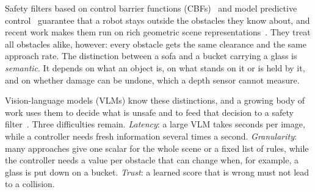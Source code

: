 \documentclass[10pt,a4paper]{article}
\begin{document}
Safety filters based on control barrier functions (CBFs)~\cite{ames2019cbf} and model predictive control~\cite{zeng2021dcbf}
guarantee that a robot stays outside the obstacles they know about, and recent work makes them run on rich geometric scene
representations~\cite{chen2025splatnav,chen2025safersplat,hong2026polymerge,tscholl2025collisioncone}. They treat all obstacles
alike, however: every obstacle gets the same clearance and the same approach rate. The distinction between a sofa and a bucket
carrying a glass is \emph{semantic}. It depends on what an object is, on what stands on it or is held by it, and on whether damage
can be undone, which a depth sensor cannot measure.

Vision-language models (VLMs) know these distinctions, and a growing body of work uses them to decide what is unsafe and to feed
that decision to a safety filter~\cite{brunke2025semantic,ravichandran2026core,feng2025words,santos2025updating,chen2026alphaadj}.
Three difficulties remain. \emph{Latency}: a large VLM takes seconds per image, while a controller needs fresh information several
times a second. \emph{Granularity}: many approaches give one scalar for the whole scene or a fixed list of rules, while the
controller needs a value per obstacle that can change when, for example, a glass is put down on a bucket. \emph{Trust}: a
learned score that is wrong must not lead to a collision.
\end{document}
